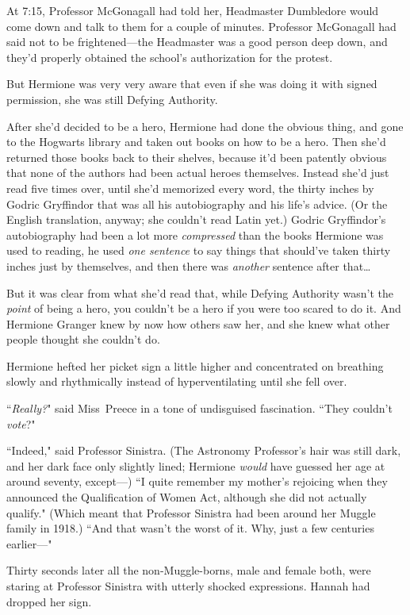 At 7:15\pm, Professor McGonagall had told her, Headmaster Dumbledore would come down and talk to them for a couple of minutes. Professor McGonagall had said not to be frightened—the Headmaster was a good person deep down, and they'd properly obtained the school's authorization for the protest.

But Hermione was very very aware that even if she was doing it with signed permission, she was still Defying Authority.

After she'd decided to be a hero, Hermione had done the obvious thing, and gone to the Hogwarts library and taken out books on how to be a hero. Then she'd returned those books back to their shelves, because it'd been patently obvious that none of the authors had been actual heroes themselves. Instead she'd just read five times over, until she'd memorized every word, the thirty inches by Godric Gryffindor that was all his autobiography and his life's advice. (Or the English translation, anyway; she couldn't read Latin yet.) Godric Gryffindor's autobiography had been a lot more \emph{compressed} than the books Hermione was used to reading, he used \emph{one sentence} to say things that should've taken thirty inches just by themselves, and then there was \emph{another} sentence after that{\ldots}

But it was clear from what she'd read that, while Defying Authority wasn't the \emph{point} of being a hero, you couldn't be a hero if you were too scared to do it. And Hermione Granger knew by now how others saw her, and she knew what other people thought she couldn't do.

Hermione hefted her picket sign a little higher and concentrated on breathing slowly and rhythmically instead of hyperventilating until she fell over.

``\emph{Really?}" said Miss~Preece in a tone of undisguised fascination. ``They couldn't \emph{vote}?"

``Indeed," said Professor Sinistra. (The Astronomy Professor's hair was still dark, and her dark face only slightly lined; Hermione \emph{would} have guessed her age at around seventy, except—) ``I quite remember my mother's rejoicing when they announced the Qualification of Women Act, although she did not actually qualify." (Which meant that Professor Sinistra had been around her Muggle family in 1918.) ``And that wasn't the worst of it. Why, just a few centuries earlier—"

Thirty seconds later all the non-Muggle-borns, male and female both, were staring at Professor Sinistra with utterly shocked expressions. Hannah had dropped her sign.

